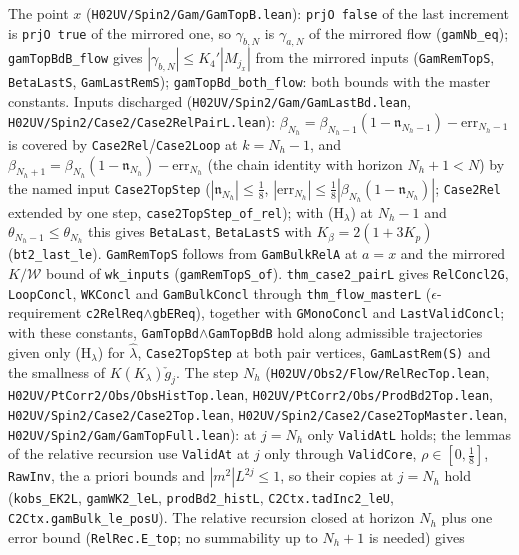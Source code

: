 \documentclass[11pt]{amsart}
\theoremstyle{definition}
\theoremstyle{remark}
\numberwithin{equation}{section}
\begin{document}
The point $x$ (\texttt{H02UV/Spin2/Gam/GamTopB.lean}): \texttt{prjO\,false} of the last increment is \texttt{prjO\,true} of the mirrored one, so
$\gamma_{b,N}$ is $\gamma_{a,N}$ of the mirrored flow (\texttt{gamNb\_eq}); \texttt{gamTopBdB\_flow} gives $|\gamma_{b,N}|\le K_4'|M_{j_x}|$ from
the mirrored inputs (\texttt{GamRemTopS}, \texttt{BetaLastS}, \texttt{GamLastRemS}); \texttt{gamTopBd\_both\_flow}:
both bounds with the master constants.
Inputs discharged (\texttt{H02UV/Spin2/Gam/GamLastBd.lean}, \texttt{H02UV/Spin2/Case2/Case2RelPairL.lean}):
$\beta_{N_h}=\beta_{N_h-1}(1-\mathfrak n_{N_h-1})-\mathrm{err}_{N_h-1}$ is covered by \texttt{Case2Rel}/\texttt{Case2Loop} at $k=N_h-1$, and
$\beta_{N_h+1}=\beta_{N_h}(1-\mathfrak n_{N_h})-\mathrm{err}_{N_h}$ (the chain identity with horizon $N_h+1<N$) by the named input
\texttt{Case2TopStep} ($|\mathfrak n_{N_h}|\le\frac18$, $|\mathrm{err}_{N_h}|\le\frac18|\beta_{N_h}(1-\mathfrak n_{N_h})|$; \texttt{Case2Rel} extended by one step,
\texttt{case2TopStep\_of\_rel}); with (H$_\lambda$) at $N_h-1$ and $\theta_{N_h-1}\le\theta_{N_h}$ this gives \texttt{BetaLast}, \texttt{BetaLastS} with
$K_\beta=2(1+3K_p)$ (\texttt{bt2\_last\_le}). \texttt{GamRemTopS} follows from \texttt{GamBulkRelA} at $a=x$ and the mirrored $K/\mathcal W$ bound of
\texttt{wk\_inputs} (\texttt{gamRemTopS\_of}). \texttt{thm\_case2\_pairL} gives \texttt{RelConcl2G}, \texttt{LoopConcl}, \texttt{WKConcl} and \texttt{GamBulkConcl} through \texttt{thm\_flow\_masterL}
($\epsilon$-requirement \texttt{c2RelReq}$\wedge$\texttt{gbEReq}), together with \texttt{GMonoConcl} and \texttt{LastValidConcl};
with these constants, \texttt{GamTopBd}$\wedge$\texttt{GamTopBdB} hold along admissible trajectories given only
(H$_\lambda$) for $\hat\lambda$, \texttt{Case2TopStep} at both pair vertices, \texttt{GamLastRem(S)} and the smallness of $K(K_\lambda)\check g_j$.
The step $N_h$ (\texttt{H02UV/Obs2/Flow/RelRecTop.lean}, \texttt{H02UV/PtCorr2/Obs/ObsHistTop.lean}, \texttt{H02UV/PtCorr2/Obs/ProdBd2Top.lean}, \texttt{H02UV/Spin2/Case2/Case2Top.lean},
\texttt{H02UV/Spin2/Case2/Case2TopMaster.lean}, \texttt{H02UV/Spin2/Gam/GamTopFull.lean}): at $j=N_h$ only \texttt{ValidAtL} holds; the lemmas of the relative recursion use
\texttt{ValidAt} at $j$ only through \texttt{ValidCore}, $\rho\in[0,\frac18]$, \texttt{RawInv}, the a priori bounds and $|m^2|L^{2j}\le1$, so their copies
at $j=N_h$ hold (\texttt{kobs\_EK2L}, \texttt{gamWK2\_leL}, \texttt{prodBd2\_histL}, \texttt{C2Ctx.tadInc2\_leU}, \texttt{C2Ctx.gamBulk\_le\_posU}).
The relative recursion closed at horizon $N_h$ plus one error bound (\texttt{RelRec.E\_top}; no summability up to $N_h+1$ is needed) gives
\end{document}
